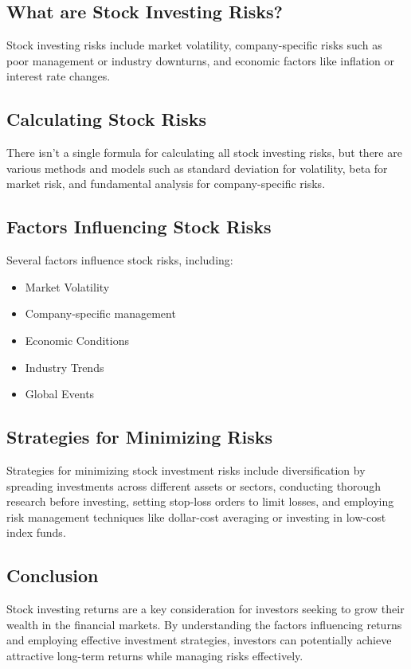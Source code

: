 \subsection{What are Stock Investing Risks?}
Stock investing risks include market volatility, company-specific risks such as poor management or industry downturns, and economic factors like inflation or interest rate changes.

\subsection{Calculating Stock Risks}
There isn't a single formula for calculating all stock investing risks, but there are various methods and models such as standard deviation for volatility, beta for market risk, and fundamental analysis for company-specific risks.

\subsection{Factors Influencing Stock Risks}
Several factors influence stock risks, including:
\begin{itemize}
    \item Market Volatility
    \item Company-specific management
    \item Economic Conditions
    \item Industry Trends
    \item Global Events
\end{itemize}

\subsection{Strategies for Minimizing Risks}
Strategies for minimizing stock investment risks include diversification by spreading investments across different assets or sectors, conducting thorough research before investing, setting stop-loss orders to limit losses, and employing risk management techniques like dollar-cost averaging or investing in low-cost index funds.

\subsection{Conclusion}
Stock investing returns are a key consideration for investors seeking to grow their wealth in the financial markets. By understanding the factors influencing returns and employing effective investment strategies, investors can potentially achieve attractive long-term returns while managing risks effectively.

